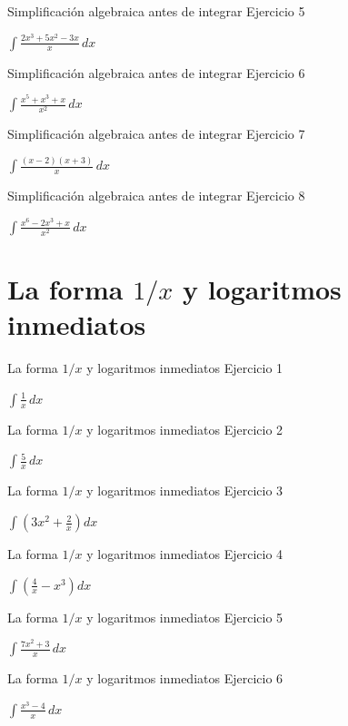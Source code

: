 \documentclass[10pt,aspectratio=169]{beamer}
\newcommand{\ejercicio}[1]{%
  \begin{center}
  \vfill
  {\fontsize{24}{30}\selectfont #1}
  \vfill
  \end{center}
}
\begin{document}
\begin{frame}{Simplificación algebraica antes de integrar}
\small Ejercicio 5
\ejercicio{$\displaystyle \int\frac{2x^3+5x^2-3x}{x}\,dx$}
\end{frame}

\begin{frame}{Simplificación algebraica antes de integrar}
\small Ejercicio 6
\ejercicio{$\displaystyle \int\frac{x^5+x^3+x}{x^2}\,dx$}
\end{frame}

\begin{frame}{Simplificación algebraica antes de integrar}
\small Ejercicio 7
\ejercicio{$\displaystyle \int\frac{(x-2)(x+3)}{x}\,dx$}
\end{frame}

\begin{frame}{Simplificación algebraica antes de integrar}
\small Ejercicio 8
\ejercicio{$\displaystyle \int\frac{x^6-2x^3+x}{x^2}\,dx$}
\end{frame}

\section{La forma $1/x$ y logaritmos inmediatos}
\begin{frame}{La forma $1/x$ y logaritmos inmediatos}
\small Ejercicio 1
\ejercicio{$\displaystyle \int\frac{1}{x}\,dx$}
\end{frame}

\begin{frame}{La forma $1/x$ y logaritmos inmediatos}
\small Ejercicio 2
\ejercicio{$\displaystyle \int\frac{5}{x}\,dx$}
\end{frame}

\begin{frame}{La forma $1/x$ y logaritmos inmediatos}
\small Ejercicio 3
\ejercicio{$\displaystyle \int\left(3x^2+\frac{2}{x}\right)dx$}
\end{frame}

\begin{frame}{La forma $1/x$ y logaritmos inmediatos}
\small Ejercicio 4
\ejercicio{$\displaystyle \int\left(\frac{4}{x}-x^3\right)dx$}
\end{frame}

\begin{frame}{La forma $1/x$ y logaritmos inmediatos}
\small Ejercicio 5
\ejercicio{$\displaystyle \int\frac{7x^2+3}{x}\,dx$}
\end{frame}

\begin{frame}{La forma $1/x$ y logaritmos inmediatos}
\small Ejercicio 6
\ejercicio{$\displaystyle \int\frac{x^3-4}{x}\,dx$}
\end{frame}
\end{document}
